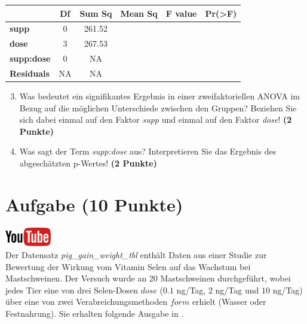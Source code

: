 \documentclass[a4paper, 9pt]{scrartcl}\usepackage[]{graphicx}\usepackage[]{xcolor}
\begin{document}
\vspace{1Ex}

\begin{center}
  \Large
  \begin{tabular}{l|c|c|c|c|c}
     & \textbf{Df} & \textbf{Sum Sq} & \textbf{Mean Sq} & \textbf{F value} & \textbf{Pr(>F)} \strut\\
    \hline
   \textbf{supp}  & 0 & 261.52 &  &  &  \strut\\
    \hline
    \textbf{dose}  & 3 & 267.53 &  &  &  \strut\\
    \hline
    \textbf{supp:dose}  & 0 & NA &  &  &  \strut\\
    \hline
   \textbf{Residuals}  & NA & NA &  &  &  \strut\\
  \end{tabular}
\end{center}

\vspace{1Ex}

\begin{enumerate}
  \setcounter{enumi}{2}
\item Was bedeutet ein signifikantes Ergebnis in einer zweifaktoriellen
  ANOVA im Bezug auf die m{\"o}glichen Unterschiede zwischen den Gruppen?
  Beziehen Sie sich dabei einmal auf den Faktor \textit{supp} und einmal
  auf den Faktor \textit{dose}! \textbf{(2 Punkte)}
\item Was sagt der Term \textit{supp:dose} aus? Interpretieren Sie das
  Ergebnis des abgesch{\"a}tzten p-Wertes! \textbf{(2 Punkte)}
\end{enumerate}
 
\clearpage

\section{Aufgabe \hfill (10 Punkte)}

\hfill\href{https://youtu.be/rWTyHXXlYjY}{\includegraphics[width =
  2cm]{img/youtube}}\\[1Ex]


Der Datensatz \textit{pig\_gain\_weight\_tbl} enth{\"a}lt Daten aus einer Studie zur Bewertung
der Wirkung vom Vitamin Selen auf das Wachstum bei Mastschweinen. Der
Versuch wurde an 20 Mastschweinen durchgef{\"u}hrt, wobei
jedes Tier eine von drei Selen-Dosen $dose$ ($0.1$ ng/Tag, $2$ ng/Tag und $10$ ng/Tag)
{\"u}ber eine von zwei Verabreichungsmethoden $form$ erhielt (Wasser oder
Festnahrung). Sie erhalten folgende Ausgabe in \Rlogo.
\end{document}

